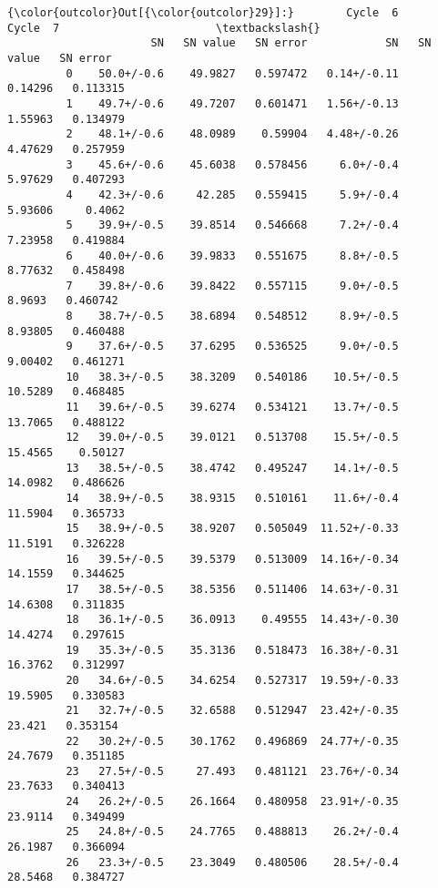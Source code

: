 \documentclass[11pt]{article}
\begin{document}
\begin{Verbatim}[commandchars=\\\{\}]
{\color{outcolor}Out[{\color{outcolor}29}]:}        Cycle  6                            Cycle  7                        \textbackslash{}
                      SN   SN value   SN error            SN   SN value   SN error   
         0    50.0+/-0.6    49.9827   0.597472   0.14+/-0.11    0.14296   0.113315   
         1    49.7+/-0.6    49.7207   0.601471   1.56+/-0.13    1.55963   0.134979   
         2    48.1+/-0.6    48.0989    0.59904   4.48+/-0.26    4.47629   0.257959   
         3    45.6+/-0.6    45.6038   0.578456     6.0+/-0.4    5.97629   0.407293   
         4    42.3+/-0.6     42.285   0.559415     5.9+/-0.4    5.93606     0.4062   
         5    39.9+/-0.5    39.8514   0.546668     7.2+/-0.4    7.23958   0.419884   
         6    40.0+/-0.6    39.9833   0.551675     8.8+/-0.5    8.77632   0.458498   
         7    39.8+/-0.6    39.8422   0.557115     9.0+/-0.5     8.9693   0.460742   
         8    38.7+/-0.5    38.6894   0.548512     8.9+/-0.5    8.93805   0.460488   
         9    37.6+/-0.5    37.6295   0.536525     9.0+/-0.5    9.00402   0.461271   
         10   38.3+/-0.5    38.3209   0.540186    10.5+/-0.5    10.5289   0.468485   
         11   39.6+/-0.5    39.6274   0.534121    13.7+/-0.5    13.7065   0.488122   
         12   39.0+/-0.5    39.0121   0.513708    15.5+/-0.5    15.4565    0.50127   
         13   38.5+/-0.5    38.4742   0.495247    14.1+/-0.5    14.0982   0.486626   
         14   38.9+/-0.5    38.9315   0.510161    11.6+/-0.4    11.5904   0.365733   
         15   38.9+/-0.5    38.9207   0.505049  11.52+/-0.33    11.5191   0.326228   
         16   39.5+/-0.5    39.5379   0.513009  14.16+/-0.34    14.1559   0.344625   
         17   38.5+/-0.5    38.5356   0.511406  14.63+/-0.31    14.6308   0.311835   
         18   36.1+/-0.5    36.0913    0.49555  14.43+/-0.30    14.4274   0.297615   
         19   35.3+/-0.5    35.3136   0.518473  16.38+/-0.31    16.3762   0.312997   
         20   34.6+/-0.5    34.6254   0.527317  19.59+/-0.33    19.5905   0.330583   
         21   32.7+/-0.5    32.6588   0.512947  23.42+/-0.35     23.421   0.353154   
         22   30.2+/-0.5    30.1762   0.496869  24.77+/-0.35    24.7679   0.351185   
         23   27.5+/-0.5     27.493   0.481121  23.76+/-0.34    23.7633   0.340413   
         24   26.2+/-0.5    26.1664   0.480958  23.91+/-0.35    23.9114   0.349499   
         25   24.8+/-0.5    24.7765   0.488813    26.2+/-0.4    26.1987   0.366094   
         26   23.3+/-0.5    23.3049   0.480506    28.5+/-0.4    28.5468   0.384727   

\end{Verbatim}
\end{document}
